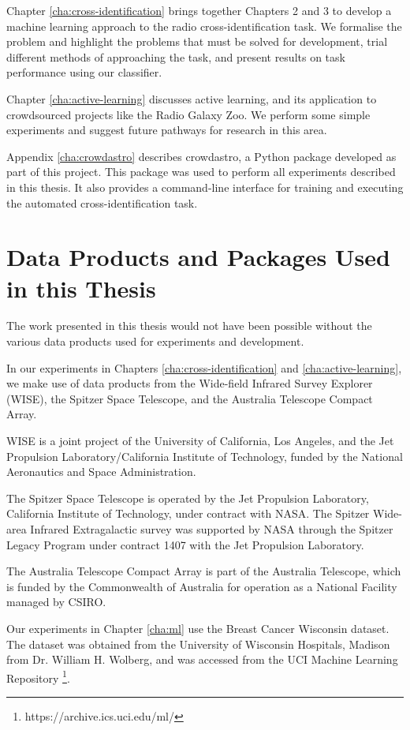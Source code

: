   Chapter \ref{cha:cross-identification} brings together Chapters 2 and 3 to
  develop a machine learning approach to the radio cross-identification task. We
  formalise the problem and highlight the problems that must be solved for
  development, trial different methods of approaching the task, and present
  results on task performance using our classifier.

  Chapter \ref{cha:active-learning} discusses active learning, and its
  application to crowdsourced projects like the Radio Galaxy Zoo. We perform
  some simple experiments and suggest future pathways for research in this area.

  Appendix \ref{cha:crowdastro} describes crowdastro, a Python package developed
  as part of this project. This package was used to perform all experiments
  described in this thesis. It also provides a command-line interface for
  training and executing the automated cross-identification task.

\section{Data Products and Packages Used in this Thesis}
\label{sec:data-products}
  
  The work presented in this thesis would not have been possible without the
  various data products used for experiments and development.

  In our experiments in Chapters \ref{cha:cross-identification} and
  \ref{cha:active-learning}, we make use of data products from the Wide-field
  Infrared Survey Explorer (WISE), the Spitzer Space Telescope, and the
  Australia Telescope Compact Array.

  WISE is a joint project of the University of California, Los Angeles, and the
  Jet Propulsion Laboratory/California Institute of Technology, funded by the
  National Aeronautics and Space Administration.

  The Spitzer Space Telescope is operated by the Jet Propulsion Laboratory,
  California Institute of Technology, under contract with NASA. The Spitzer
  Wide-area Infrared Extragalactic survey was supported by NASA through the
  Spitzer Legacy Program under contract 1407 with the Jet Propulsion Laboratory.

  The Australia Telescope Compact Array is part of the Australia Telescope,
  which is funded by the Commonwealth of Australia for operation as a National
  Facility managed by CSIRO.

  Our experiments in Chapter \ref{cha:ml} use the Breast Cancer Wisconsin
  dataset. The dataset was obtained from the University of Wisconsin Hospitals,
  Madison from Dr. William H. Wolberg, and was accessed from the UCI Machine
  Learning Repository \footnote{https://archive.ics.uci.edu/ml/}.

